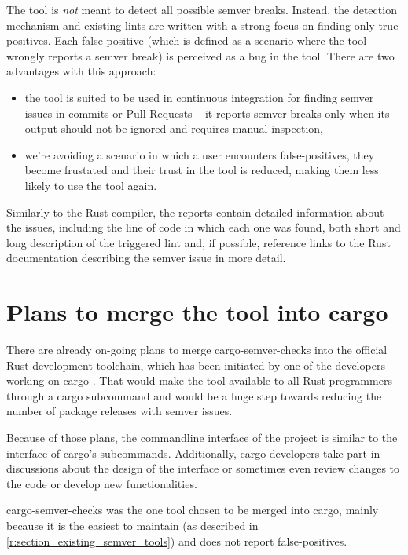 \documentclass[licencjacka,en]{pracamgr}
\begin{document}
The tool is \textit{not} meant to detect all possible semver breaks. Instead, the detection
mechanism and existing lints are written with a strong focus on finding only true-positives.
Each false-positive (which is defined as a scenario where the tool wrongly reports a semver break)
is perceived as a bug in the tool. There are two advantages with this approach:
\begin{itemize}
	\item the tool is suited to be used in continuous integration for finding semver issues in
		commits or Pull Requests -- it reports semver breaks only when its output should not be
		ignored and requires manual inspection,
	\item we're avoiding a scenario in which a user encounters false-positives, they become
		frustated and their trust in the tool is reduced, making them less likely to use the
		tool again.
\end{itemize}

Similarly to the Rust compiler, the reports contain detailed information about the issues,
including the line of code in which each one was found, both short and long description of the
triggered lint and, if possible, reference links to the Rust documentation describing the semver
issue in more detail.

\section{Plans to merge the tool into cargo}

There are already on-going plans to merge cargo-semver-checks into the official Rust development
toolchain, which has been initiated by one of the developers working on cargo
\cite{issue_merge_cargo}. That would make the tool available to all Rust programmers through
a cargo subcommand and would be a huge step towards reducing the number of package releases with
semver issues.

Because of those plans, the commandline interface of the project is similar to the interface of
cargo's subcommands. Additionally, cargo developers take part in discussions about the design of
the interface \cite{issue_cli_interface} or sometimes even review changes to the code or develop
new functionalities.

cargo-semver-checks was the one tool chosen to be merged into cargo, mainly because it is the
easiest to maintain (as described in \ref{r:section_existing_semver_tools}) and does not report
false-positives.
\end{document}
